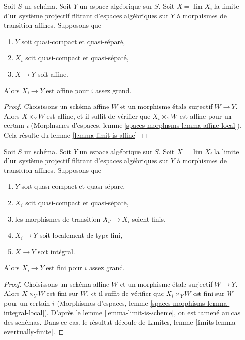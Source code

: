 \begin{lemma}
\label{lemma-eventually-affine}
Soit $S$ un schéma. Soit $Y$ un espace algébrique sur $S$.
Soit $X = \lim X_i$ la limite d'un système projectif filtrant d'espaces
algébriques sur $Y$ à morphismes de transition affines. Supposons que
\begin{enumerate}
\item $Y$ soit quasi-compact et quasi-séparé,
\item $X_i$ soit quasi-compact et quasi-séparé,
\item $X \to Y$ soit affine.
\end{enumerate}
Alors $X_i \to Y$ est affine pour $i$ assez grand.
\end{lemma}

\begin{proof}
Choisissons un schéma affine $W$ et un morphisme étale surjectif $W \to Y$.
Alors $X \times_Y W$ est affine, et il suffit de vérifier que
$X_i \times_Y W$ est affine pour un certain $i$ (Morphismes d'espaces,
lemme \ref{spaces-morphisms-lemma-affine-local}).
Cela résulte du lemme \ref{lemma-limit-is-affine}.
\end{proof}

\begin{lemma}
\label{lemma-eventually-finite}
Soit $S$ un schéma. Soit $Y$ un espace algébrique sur $S$.
Soit $X = \lim X_i$ la limite d'un système projectif filtrant d'espaces
algébriques sur $Y$ à morphismes de transition affines. Supposons que
\begin{enumerate}
\item $Y$ soit quasi-compact et quasi-séparé,
\item $X_i$ soit quasi-compact et quasi-séparé,
\item les morphismes de transition $X_{i'} \to X_i$ soient finis,
\item $X_i \to Y$ soit localement de type fini,
\item $X \to Y$ soit intégral.
\end{enumerate}
Alors $X_i \to Y$ est fini pour $i$ assez grand.
\end{lemma}

\begin{proof}
Choisissons un schéma affine $W$ et un morphisme étale surjectif $W \to Y$.
Alors $X \times_Y W$ est fini sur $W$, et il suffit de vérifier que
$X_i \times_Y W$ est fini sur $W$ pour un certain $i$ (Morphismes d'espaces,
lemme \ref{spaces-morphisms-lemma-integral-local}). D'après le
lemme \ref{lemma-limit-is-scheme}, on est ramené au cas des schémas.
Dans ce cas, le résultat découle de
Limites, lemme \ref{limits-lemma-eventually-finite}.
\end{proof}

